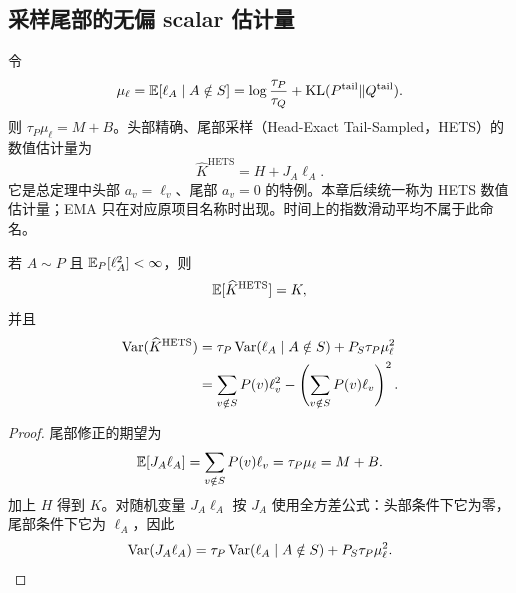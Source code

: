 \subsection{采样尾部的无偏 scalar 估计量}

令
\begin{equation*}
 \mu_\ell=\mathbb E[\ell_A\mid A\notin S]
 =\log\frac{\tau_P}{\tau_Q}+\operatorname{KL}(P^{\mathrm{tail}}\Vert Q^{\mathrm{tail}}).
\end{equation*}
则 $\tau_P\mu_\ell=M+B$。头部精确、尾部采样（Head-Exact Tail-Sampled，HETS）的数值估计量为
\begin{equation}
 \widehat K^{\mathrm{HETS}}=H+J_A \ell_A.
 \label{est:eq:chapter3-ema-scalar}
\end{equation}
它是总定理中头部 $a_v=\ell_v$、尾部 $a_v=0$ 的特例。本章后续统一称为 HETS 数值估计量；EMA 只在对应原项目名称时出现。时间上的指数滑动平均不属于此命名。

\begin{theorem}
\label{est:thm:chapter3-ema-scalar}
若 $A\sim P$ 且 $\mathbb E_P[\ell_A^2]<\infty$，则
\begin{equation*}
 \mathbb E[\widehat K^{\mathrm{HETS}}]=K,
\end{equation*}
并且
\begin{align}
 \operatorname{Var}(\widehat K^{\mathrm{HETS}})
 &=\tau_P\operatorname{Var}(\ell_A\mid A\notin S)+P_S\tau_P\mu_\ell^2\\
 &=\sum_{v\notin S}P(v)\ell_v^2
   -\left(\sum_{v\notin S}P(v)\ell_v\right)^2.
 \label{est:eq:chapter3-ema-scalar-var}
\end{align}
\end{theorem}

\begin{proof}
尾部修正的期望为
\begin{equation*}
 \mathbb E[J_A \ell_A]=\sum_{v\notin S}P(v)\ell_v=\tau_P\mu_\ell=M+B.
\end{equation*}
加上 $H$ 得到 $K$。对随机变量 $J_A \ell_A$ 按 $J_A$ 使用全方差公式：头部条件下它为零，尾部条件下它为 $\ell_A$，因此
\begin{equation*}
 \operatorname{Var}(J_A \ell_A)=\tau_P\operatorname{Var}(\ell_A\mid A\notin S)+P_S\tau_P\mu_\ell^2.
\end{equation*}
\end{proof}

